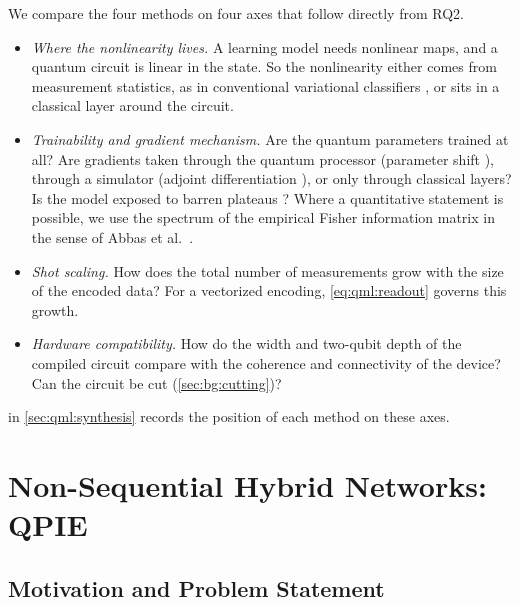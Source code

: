 We compare the four methods on four axes that follow directly from RQ2.
\begin{itemize}
\item \emph{Where the nonlinearity lives.} A learning model needs nonlinear maps, and a quantum circuit is linear in the state. So the nonlinearity either comes from measurement statistics, as in conventional variational classifiers \cite{schuld2020circuitcentric,perezsalinas2020reuploading}, or sits in a classical layer around the circuit.
\item \emph{Trainability and gradient mechanism.} Are the quantum parameters trained at all? Are gradients taken through the quantum processor (parameter shift \cite{crooks2019parametershift}), through a simulator (adjoint differentiation \cite{jones2020adjoint}), or only through classical layers? Is the model exposed to barren plateaus \cite{mcclean2018barren}? Where a quantitative statement is possible, we use the spectrum of the empirical Fisher information matrix in the sense of Abbas et al.~\cite{abbas2021powerqnn}.
\item \emph{Shot scaling.} How does the total number of measurements grow with the size of the encoded data? For a vectorized encoding, \cref{eq:qml:readout} governs this growth.
\item \emph{Hardware compatibility.} How do the width and two-qubit depth of the compiled circuit compare with the coherence and connectivity of the device? Can the circuit be cut (\cref{sec:bg:cutting})?
\end{itemize}
 in \cref{sec:qml:synthesis} records the position of each method on these axes.

\section{Non-Sequential Hybrid Networks: QPIE}\label{sec:qml:qpie}

\subsection{Motivation and Problem Statement}\label{sec:qml:qpie:motivation}

